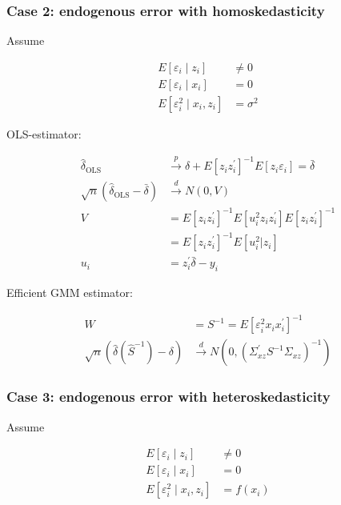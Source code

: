 \subsubsection{Case 2: endogenous error with homoskedasticity}

Assume 

\begin{align*}
    E\left[\varepsilon_i \mid z_i\right]&\neq 0 \\
    E\left[\varepsilon_i \mid x_i\right]&=0 \\
    E\left[\varepsilon_i^2 \mid x_i, z_i\right]&=\sigma^2
\end{align*}

OLS-estimator:

\begin{align*}
    \hat{\delta}_{\operatorname{OLS}} &\stackrel{p}{\rightarrow} \delta+E\left[z_i z_i^\prime\right]^{-1} E\left[z_i \varepsilon_i\right] = \bar{\delta} \\
    \sqrt{n}\left(\hat{\delta}_{\operatorname{OLS}} - \bar{\delta} \right)&\stackrel{d}{\rightarrow} N(0,V) \\
    V &= E\left[z_i z_i^\prime\right]^{-1} E\left[u_i^2 z_i z_i^\prime \right] E\left[z_i z_i^\prime\right]^{-1} \\
    &= E\left[z_i z_i^\prime\right]^{-1} E\left[u_i^2 | z_i \right] \\
    u_i &= z_i^\prime \bar{\delta} - y_i
\end{align*}

Efficient GMM estimator:

\begin{align*}
    W&=S^{-1}=E\left[\varepsilon_i^2 x_i x_i^{\prime}\right]^{-1} \\
    \sqrt{n}\left(\widehat{\delta}\left(\widehat{S}^{-1}\right)-\delta\right) &\stackrel{d}{\longrightarrow} N\left(0,\left(\Sigma_{x z}^{\prime} S^{-1} \Sigma_{x z}\right)^{-1}\right)
\end{align*}

\subsubsection{Case 3: endogenous error with heteroskedasticity}

Assume 

\begin{align*}
    E\left[\varepsilon_i \mid z_i\right]&\neq 0 \\
    E\left[\varepsilon_i \mid x_i\right]&=0 \\
    E\left[\varepsilon_i^2 \mid x_i, z_i\right]&=f(x_i)
\end{align*}

